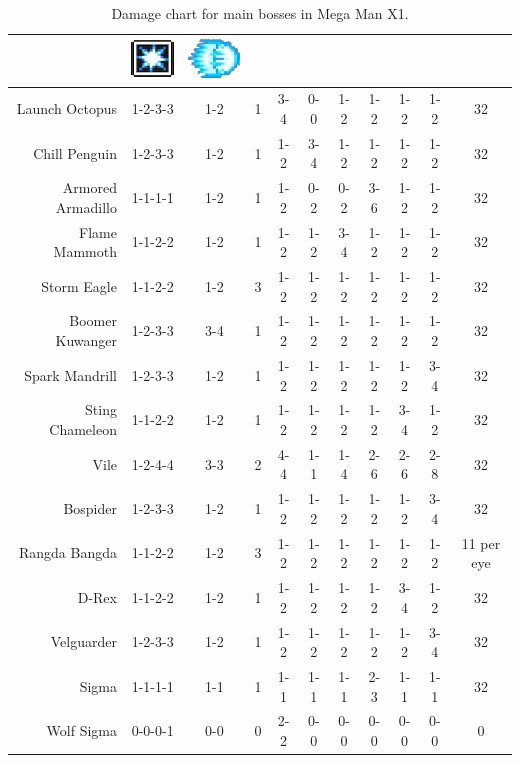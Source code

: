 \begin{table}[htp]
{\begin{tabular}{r *{10}{c}}
		&{\includegraphics[scale=0.5]{figures/X1/weapons/S_ice.jpg}} &{\includegraphics[scale=0.5]{figures/X1/weapons/hadoken_sprite.png}}\\
		\midrule
		Launch Octopus&	 	1-2-3-3& 1-2& 1 & 3-4& 0-0& 1-2& 1-2& 1-2& 1-2& 32\\
		Chill Penguin&	 	1-2-3-3& 1-2& 1 & 1-2& 3-4& 1-2& 1-2& 1-2& 1-2& 32\\
		Armored Armadillo& 	1-1-1-1& 1-2& 1 & 1-2& 0-2& 0-2& 3-6& 1-2& 1-2& 32\\
		Flame Mammoth& 		1-1-2-2& 1-2& 1 & 1-2& 1-2& 3-4& 1-2& 1-2& 1-2& 32\\
		Storm Eagle& 		1-1-2-2& 1-2& 3 & 1-2& 1-2& 1-2& 1-2& 1-2& 1-2& 32\\
		Boomer Kuwanger&	1-2-3-3& 3-4& 1 & 1-2& 1-2& 1-2& 1-2& 1-2& 1-2& 32\\
		Spark Mandrill&		1-2-3-3& 1-2& 1 & 1-2& 1-2& 1-2& 1-2& 1-2& 3-4& 32\\
		Sting Chameleon&	1-1-2-2& 1-2& 1 & 1-2& 1-2& 1-2& 1-2& 3-4& 1-2& 32\\
		Vile &				1-2-4-4& 3-3& 2 & 4-4& 1-1& 1-4& 2-6& 2-6& 2-8& 32\\
		Bospider&			1-2-3-3& 1-2& 1 & 1-2& 1-2& 1-2& 1-2& 1-2& 3-4& 32\\
		Rangda Bangda&		1-1-2-2& 1-2& 3 & 1-2& 1-2& 1-2& 1-2& 1-2& 1-2& 11 per eye\\
		D-Rex&				1-1-2-2& 1-2& 1 & 1-2& 1-2& 1-2& 1-2& 3-4& 1-2& 32\\
		Velguarder&			1-2-3-3& 1-2& 1 & 1-2& 1-2& 1-2& 1-2& 1-2& 3-4& 32\\
		Sigma&				1-1-1-1& 1-1& 1 & 1-1& 1-1& 1-1& 2-3& 1-1& 1-1& 32\\
		Wolf Sigma&			0-0-0-1& 0-0& 0 & 2-2& 0-0& 0-0& 0-0& 0-0& 0-0& 0\\
		\bottomrule
	\end{tabular}
	}	
	\caption{Damage chart for main bosses in Mega Man X1.}
\end{table}